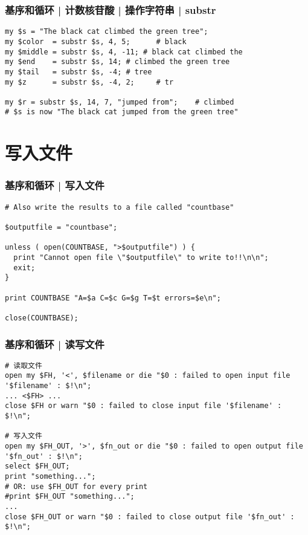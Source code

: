 \begin{frame}[fragile]
  \frametitle{基序和循环 | 计数核苷酸 | 操作字符串 | \alert{substr}}
\begin{lstlisting}
my $s = "The black cat climbed the green tree";
my $color  = substr $s, 4, 5;      # black
my $middle = substr $s, 4, -11; # black cat climbed the
my $end    = substr $s, 14; # climbed the green tree
my $tail   = substr $s, -4; # tree
my $z      = substr $s, -4, 2;     # tr

my $r = substr $s, 14, 7, "jumped from";    # climbed
# $s is now "The black cat jumped from the green tree"
\end{lstlisting}
\end{frame}

\section{写入文件}
\begin{frame}[fragile]
  \frametitle{基序和循环 | \alert{写入文件}}
\begin{lstlisting}
# Also write the results to a file called "countbase"

$outputfile = "countbase";

unless ( open(COUNTBASE, ">$outputfile") ) {
  print "Cannot open file \"$outputfile\" to write to!!\n\n";
  exit;
}

print COUNTBASE "A=$a C=$c G=$g T=$t errors=$e\n";

close(COUNTBASE);
\end{lstlisting}
\end{frame}

\begin{frame}[fragile]
  \frametitle{基序和循环 | \alert{读写文件}}
\begin{lstlisting}[basicstyle=\small\tt]
# 读取文件
open my $FH, '<', $filename or die "$0 : failed to open input file '$filename' : $!\n";
... <$FH> ...
close $FH or warn "$0 : failed to close input file '$filename' : $!\n";

# 写入文件
open my $FH_OUT, '>', $fn_out or die "$0 : failed to open output file '$fn_out' : $!\n";
select $FH_OUT;
print "something...";
# OR: use $FH_OUT for every print
#print $FH_OUT "something...";
... 
close $FH_OUT or warn "$0 : failed to close output file '$fn_out' : $!\n";
\end{lstlisting}
\end{frame}

